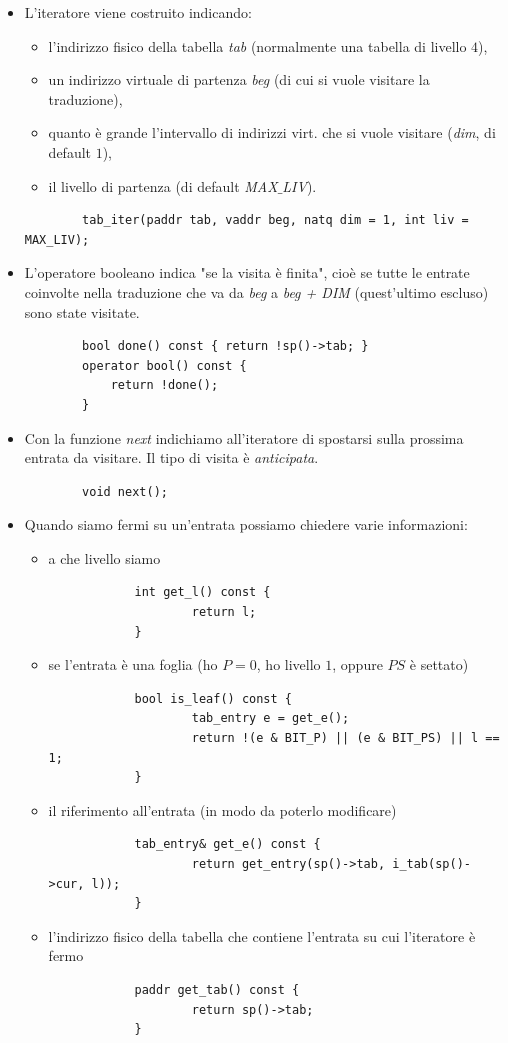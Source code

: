 \documentclass[11pt]{report}
\theoremstyle{definition}
\begin{document}
\begin{itemize}
	\item L'iteratore viene costruito indicando:
	\begin{itemize}
		\item l'indirizzo fisico della tabella \emph{tab} (normalmente una tabella di livello $4$), 
		\item un indirizzo virtuale di partenza \emph{beg}  (di cui si vuole visitare la traduzione),
		\item quanto è grande l'intervallo di indirizzi virt. che si vuole visitare (\emph{dim}, di default $1$),
		\item il livello di partenza (di default \emph{MAX$\_$LIV}).
	\end{itemize} 
	\begin{verbatim}
		tab_iter(paddr tab, vaddr beg, natq dim = 1, int liv = MAX_LIV);
	\end{verbatim}
	\item L'operatore booleano indica "se la visita è finita", cioè se tutte le entrate coinvolte nella traduzione che va da \emph{beg} a \emph{beg + DIM} (quest'ultimo escluso) sono state visitate.
	\begin{verbatim}
		bool done() const { return !sp()->tab; }
		operator bool() const {
			return !done();
		}
	\end{verbatim}
	\item Con la funzione \emph{next} indichiamo all'iteratore di spostarsi sulla prossima entrata da visitare. Il tipo di visita è  \emph{anticipata}.
	\begin{verbatim}
		void next();
	\end{verbatim}
	\item Quando siamo fermi su un'entrata possiamo chiedere varie informazioni:
	\begin{itemize}
		\item a che livello siamo
		\begin{verbatim}
			int get_l() const {
				    return l;
			}
		\end{verbatim}
		\item se l'entrata è una foglia (ho $P=0$, ho livello $1$, oppure $PS$ è settato)
		\begin{verbatim}
			bool is_leaf() const {
				    tab_entry e = get_e();
				    return !(e & BIT_P) || (e & BIT_PS) || l == 1;
			}
		\end{verbatim}
		\item il riferimento all'entrata (in modo da poterlo modificare)
		\begin{verbatim}
			tab_entry& get_e() const {
				    return get_entry(sp()->tab, i_tab(sp()->cur, l));
			}
		\end{verbatim}
		\item l'indirizzo fisico della tabella che contiene l'entrata su cui l'iteratore è fermo 
		\begin{verbatim}
			paddr get_tab() const {
				    return sp()->tab;
			}
		\end{verbatim}
	\end{itemize}
\end{itemize}
\end{document}
